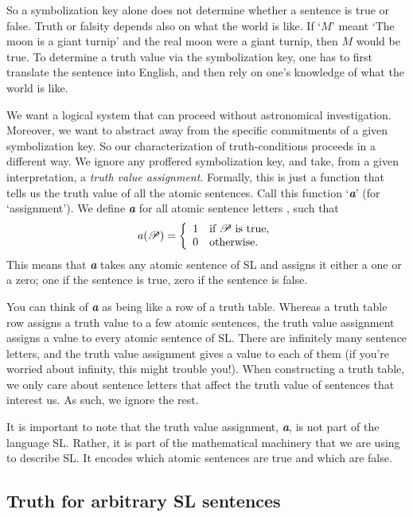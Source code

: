 {{So a symbolization key alone does not determine whether a sentence is true or false. Truth or falsity depends also on what the world is like. If `$M$' meant `The moon is a giant turnip' and the real moon were a giant turnip, then $M$ would be true. To determine a truth value via the symbolization key, one has to first translate the sentence into English, and then rely on one's knowledge of what the world is like.

We want a logical system that can proceed without astronomical investigation. Moreover, we want to abstract away from the specific commitments of a given symbolization key. So our characterization of truth-conditions proceeds in a different way. We ignore any proffered symbolization key, and take, from a given interpretation, a \emph{truth value assignment}. Formally, this is just a function that tells us the truth value of all the atomic sentences. Call this function `\textit{\textbf{a}}' (for `assignment'). We define \textit{\textbf{a}} for all atomic sentence letters , such that
\begin{displaymath}
a(\mathscr{P}) =
\left\{
	\begin{array}{ll}
	1 & \mbox{if \ensuremath{\mathscr{P}} is true},\\
	0 & \mbox{otherwise.}
	\end{array}
\right.
\end{displaymath}
This means that \textit{\textbf{a}} takes any atomic sentence of SL and assigns it either a one or a zero; one if the sentence is true, zero if the sentence is false. 

You can think of \textit{\textbf{a}} as being like a row of a truth table. Whereas a truth table row assigns a truth value to a few atomic sentences, the truth value assignment assigns a value to every atomic sentence of SL. There are infinitely many sentence letters, and the truth value assignment gives a value to each of them {\color{black}(if you're worried about infinity, this might trouble you!)}. When constructing a truth table, we only care about sentence letters that affect the truth value of sentences that interest us. As such, we ignore the rest.

It is important to note that the truth value assignment, \textit{\textbf{a}}, is not part of the language SL. Rather, it is part of the mathematical machinery that we are using to describe SL. It encodes which atomic sentences are true and which are false.

\subsection{Truth for arbitrary SL sentences}

}}
